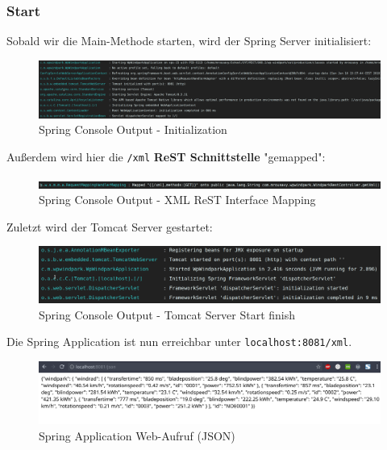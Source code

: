 \subsubsection{Start}

Sobald wir die Main-Methode starten, wird der Spring Server initialisiert:

\begin{figure}
    \caption{Spring Console Output - Initialization}
    \includegraphics[width=15cm]{images/spring-console-init}
    \centering
\end{figure}

Außerdem wird hier die \texttt{/xml} \textbf{ReST Schnittstelle} "gemapped":

\begin{figure}
    \caption{Spring Console Output - XML ReST Interface Mapping}
    \includegraphics[width=15cm]{images/spring-console-mapped}
    \centering
\end{figure}

Zuletzt wird der Tomcat Server gestartet:

\begin{figure}
    \caption{Spring Console Output - Tomcat Server Start finish}
    \includegraphics[width=15cm]{images/spring-console-finish}
    \centering
\end{figure}

Die Spring Application ist nun erreichbar unter \texttt{localhost:8081/xml}.

\begin{figure}
    \caption{Spring Application Web-Aufruf (JSON)}
    \includegraphics[width=15cm]{images/spring-app-json}
    \centering
\end{figure}

